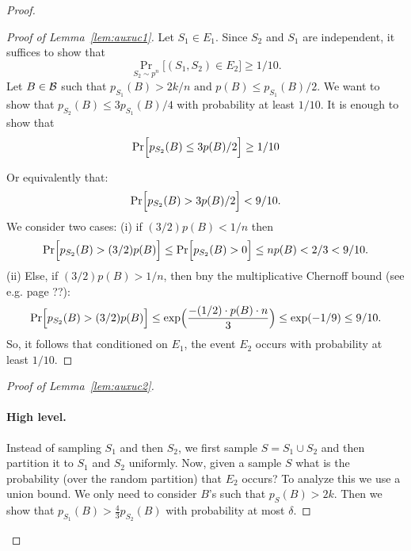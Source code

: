 \documentclass{article}
\newcommand{\B}{{\cal B}}
\newcommand{\samp}{S}
\begin{document}
\begin{proof}
\begin{proof}[Proof of Lemma~\ref{lem:auxuc1}]
Let $S_1\in E_1$. Since $S_2$ and $S_1$ are independent,
it suffices to show that 
\[\Pr_{S_2\sim p^n}\bigl[(S_1,S_2)\in E_2\bigr] \geq 1/10.\]
Let $B\in\B$ such that $p_{\samp_1}(B)>2k/n \mbox{ and } p(B) \leq p_{\samp_1}(B)/2$.
We want to show that $p_{\samp_2}(B) \leq 3p_{\samp_1}(B)/4$ with probability at least $1/10$.
It is enough to show that 
\[ \Pr\Bigl[ p_{\samp_2}(B) \leq 3p(B)/2\Bigr] \geq 1/10 \]

Or equivalently that:
\[
\Pr\Bigl[ p_{\samp_2}(B) > 3p(B)/2\Bigr]
<
9/10.
\]
We consider two cases:
(i) if $(3/2)p(B) < 1/n$
then
\[
\Pr\Bigl[ p_{\samp_2}(B) > (3/2)p(B)\Bigr]
\leq
\Pr\Bigl[ p_{\samp_2}(B) > 0 \Bigr]
\leq np(B) < 2/3 < 9/10.
\]
(ii) Else, if $(3/2)p(B) > 1/n$, then bny the multiplicative Chernoff bound (see e.g.\cite{} page ??):
\[
\Pr\Bigl[ p_{\samp_2}(B) > (3/2)p(B)\Bigr]
\leq
\exp\Bigl( \frac{-({1}/{2})\cdot p(B)\cdot n}{3}\Bigr)\leq\exp(-1/9)\leq9/10.
\]
So, it follows that conditioned on $E_1$, 
the event $E_2$ occurs with probability at least $1/10$.



\end{proof}


\begin{proof}[Proof of Lemma~\ref{lem:auxuc2}]\ \\

\paragraph{High level.}
Instead of sampling $S_1$ and then $S_2$,
we first sample $S=S_1\cup S_2$ and 
then partition it to $S_1$ and $S_2$ uniformly.
Now, given a sample $S$ what is the probability (over the random partition)
that $E_2$ occurs?
To analyze this we use a union bound. 
We only need to consider $B$'s such that $p_S(B) > 2k$.
Then we show that $p_{S_1}(B) > \frac{4}{3}p_{S_2}(B)$
with probability at most $\delta$.

\end{proof}

  
  
%
%

  \end{proof}
\end{document}
